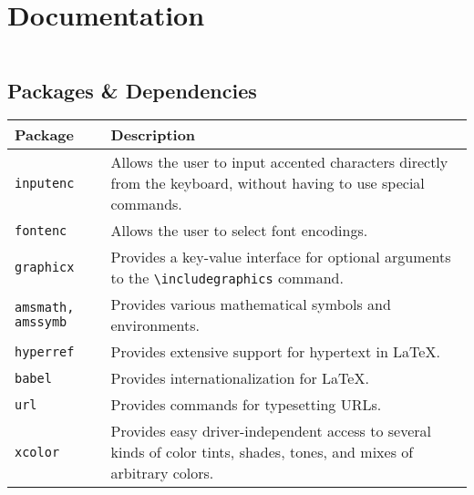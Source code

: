 \documentclass[11pt]{report}
\begin{document}
	\chapter{Documentation}
	\begin{phantom}
		\begin{verbatim}
		\end{verbatim}
	\end{phantom}
	\section{Packages \& Dependencies}

	\noindent\begin{tabularx}{\linewidth}{|X|X|}
		\hline
		\textbf{Package}        & \textbf{Description}                                                                                                   \\
		\hline
		\verb|inputenc|         & Allows the user to input accented characters directly from the keyboard, without having to use special commands.       \\
		\hline
		\verb|fontenc|          & Allows the user to select font encodings.                                                                              \\
		\hline
		\verb|graphicx|         & Provides a key-value interface for optional arguments to the \verb|\includegraphics| command.                          \\
		\hline
		\verb|amsmath, amssymb| & Provides various mathematical symbols and environments.                                                                \\
		\hline
		\verb|hyperref|         & Provides extensive support for hypertext in LaTeX.                                                                     \\
		\hline
		\verb|babel|            & Provides internationalization for LaTeX.                                                                               \\
		\hline
		\verb|url|              & Provides commands for typesetting URLs.                                                                                \\
		\hline
		\verb|xcolor|           & Provides easy driver-independent access to several kinds of color tints, shades, tones, and mixes of arbitrary colors. \\

\end{tabularx}
\end{document}
